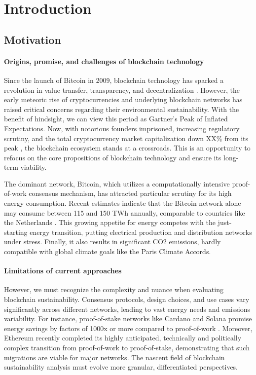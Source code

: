 \documentclass[11pt]{report}
\begin{document}
\printacronyms
\printglossary

\chapter{Introduction}

\section{Motivation}
\subsubsection*{Origins, promise, and challenges of blockchain technology}
Since the launch of Bitcoin in 2009, blockchain technology has sparked a revolution in value transfer, transparency, and decentralization \cite{nakamotoBitcoinPeertopeerElectronic2008}. However, the early meteoric rise of cryptocurrencies and underlying blockchain networks has raised critical concerns regarding their environmental sustainability. With the benefit of hindsight, we can view this period as Gartner's Peak of Inflated Expectations. Now, with notorious founders imprisoned, increasing regulatory scrutiny, and the total cryptocurrency market capitalization down
XX\% from its peak , the blockchain ecosystem stands at a crossroads. This is an opportunity to refocus on the core propositions of blockchain technology and ensure its long-term viability.


The dominant network, Bitcoin, which utilizes a computationally intensive proof-of-work consensus mechanism, has attracted particular scrutiny for its high energy consumption. Recent estimates indicate that the Bitcoin network alone may consume between 115 and 150 TWh annually, comparable to countries like the Netherlands \cite{devriesRevisitingBitcoinCarbon2022,neumuellerCambridgeBitcoinElectricity2021}. This growing appetite for energy competes with the just-starting energy transition, putting electrical production and distribution networks under stress. Finally, it also results in significant CO2 emissions, hardly compatible with global climate goals like the Paris Climate Accords.

\subsubsection*{Limitations of current approaches}
However, we must recognize the complexity and nuance when evaluating blockchain sustainability. Consensus protocols, design choices, and use cases vary significantly across different networks, leading to vast energy needs and emissions variability. For instance, proof-of-stake networks like Cardano and Solana promise energy savings by factors of 1000x or more compared to proof-of-work \cite{kohliAnalysisEnergyConsumption2023}. Moreover, Ethereum recently completed its highly anticipated, technically and politically complex transition from proof-of-work to proof-of-stake, demonstrating that such migrations are viable for major networks. \cite{bloombergnewsEthereumMergeYour2022} The nascent field of blockchain sustainability analysis must evolve more granular, differentiated perspectives.
\end{document}

